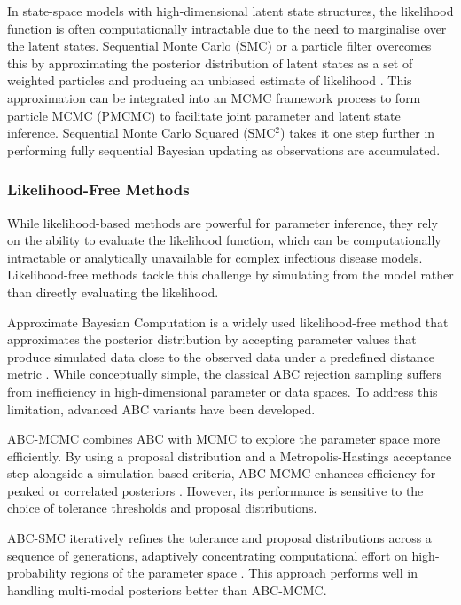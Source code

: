 \documentclass{article}
\begin{document}
In state-space models with high-dimensional latent state structures, the likelihood function is often computationally intractable due to the need to marginalise over the latent states. Sequential Monte Carlo (SMC) or a particle filter overcomes this by approximating the posterior distribution of latent states as a set of weighted particles and producing an unbiased estimate of likelihood \citep{doucet2001introduction}. This approximation can be integrated into an MCMC framework process to form particle MCMC (PMCMC) \citep{andrieu2010particle, endo2019introduction} to facilitate joint parameter and latent state inference. Sequential Monte Carlo Squared (SMC$^2$) \citep{chopin2013smc2} takes it one step further in performing fully sequential Bayesian updating as observations are accumulated.

\subsubsection{Likelihood-Free Methods}

While likelihood-based methods are powerful for parameter inference, they rely on the ability to evaluate the likelihood function, which can be computationally intractable or analytically unavailable for complex infectious disease models. Likelihood-free methods tackle this challenge by simulating from the model rather than directly evaluating the likelihood.

Approximate Bayesian Computation is a widely used likelihood-free method that approximates the posterior distribution by accepting parameter values that produce simulated data close to the observed data under a predefined distance metric \citep{rubin1984bayesianly, tavare1997inferring, beaumont2002approximate}. While conceptually simple, the classical ABC rejection sampling suffers from inefficiency in high-dimensional parameter or data spaces. To address this limitation, advanced ABC variants have been developed. 

ABC-MCMC combines ABC with MCMC to explore the parameter space more efficiently. By using a proposal distribution and a Metropolis-Hastings acceptance step alongside a simulation-based criteria, ABC-MCMC enhances efficiency for peaked or correlated posteriors \citep{marjoram2003markov, wegmann2009efficient, kypraios2017tutorial}. However, its performance is sensitive to the choice of tolerance thresholds and proposal distributions.

ABC-SMC iteratively refines the tolerance and proposal distributions across a sequence of generations, adaptively concentrating computational effort on high-probability regions of the parameter space \citep{sisson2007sequential, toni2009approximate, beaumont2009adaptive, drovandi2011likelihood}. This approach performs well in handling multi-modal posteriors better than ABC-MCMC.
\end{document}
